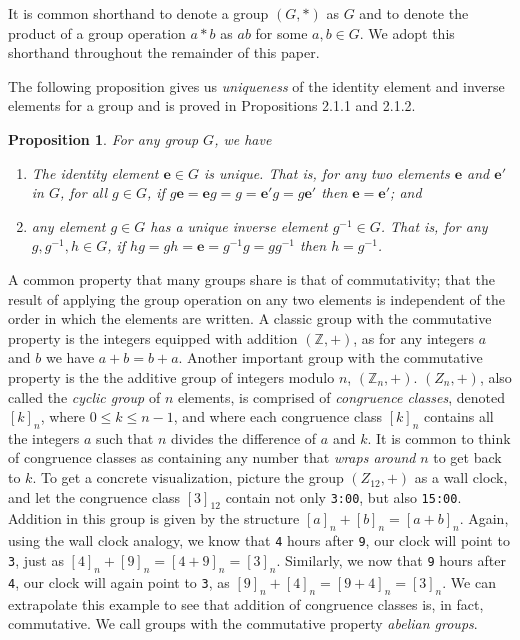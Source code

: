 \documentclass[12pt]{amsart}
\newtheorem{proposition}[theorem]{Proposition}
\theoremstyle{definition}
\theoremstyle{plain}
\def\id{{\mathbf e}}
\def\Z{{\mathbb Z}}
\begin{document}
It is common shorthand to denote a group $\left( G, * \right)$ as $G$ and to denote the product of a group operation $a * b$ as $ab$ for some $a,b \in G$. We adopt this shorthand throughout the remainder of this paper.

The following proposition gives us \emph{uniqueness} of the identity element and inverse elements for a group and is proved in \cite{goodman2014algebra} Propositions 2.1.1 and 2.1.2.

\begin{proposition}
For any group $G$, we have
\begin{enumerate}
    \item The identity element $\id \in G$ is unique. That is, for any two elements $\id$ and $\id'$ in $G$, for all $g \in G$, if $g\id = \id g = g = \id'g = g \id'$ then $\id = \id'$; and
    \item any element $g \in G$ has a unique inverse element $g^{-1} \in G$. That is, for any $g,g^{-1},h \in G$, if $hg = gh = \id = g^{-1}g = gg^{-1}$ then $h=g^{-1}$.
\end{enumerate}
\end{proposition}

A common property that many groups share is that of commutativity; that the result of applying the group operation on any two elements is independent of the order in which the elements are written. A classic group with the commutative property is the integers equipped with addition $(\Z, +)$, as for any integers $a$ and $b$ we have $a+b=b+a$. Another important group with the commutative property is the the additive group of integers modulo $n$, $(\Z_n, +)$.  $(Z_n, +)$, also called the \emph{cyclic group} of $n$ elements, is comprised of \emph{congruence classes}, denoted $[k]_n$, where $0 \leq k \leq n - 1$, and where each congruence class $[k]_n$ contains all the integers $a$ such that $n$ divides the difference of $a$ and $k$. It is common to think of congruence classes as containing any number that \emph{wraps around} $n$ to get back to $k$. To get a concrete visualization, picture the group $(Z_{12},+)$ as a wall clock, and let the congruence class $[3]_{12}$ contain not only \texttt{3:00}, but also \texttt{15:00}. Addition in this group is given by the structure $[a]_n + [b]_n = [a+b]_n$. Again, using the wall clock analogy, we know that \texttt{4} hours after \texttt{9}, our clock will point to \texttt{3}, just as $[4]_n + [9]_n = [4+9]_n = [3]_n$. Similarly, we now that \texttt{9} hours after \texttt{4}, our clock will again point to \texttt{3}, as $[9]_n+[4]_n = [9+4]_n = [3]_n$. We can extrapolate this example to see that addition of congruence classes is, in fact, commutative. We call groups with the commutative property \emph{abelian groups}.
\end{document}
